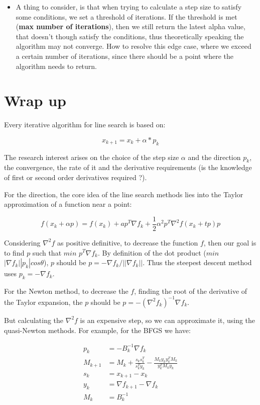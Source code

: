 \documentclass[a4paper,11pt]{article}
\numberwithin{equation}{section} %
\begin{document}
\begin{itemize}
    \item A thing to consider, is that when trying to calculate a step size to satisfy some conditions, we set a threshold of iterations. If the threshold is met (\textbf{max number of iterations}), then we still return the latest alpha value, that doesn't though satisfy the conditions, thus theoretically speaking the algorithm may not converge. How to resolve this edge case, where we exceed a certain number of iterations, since there should be a point where the algorithm needs to return.
    
\end{itemize} 


\section{Wrap up}

Every iterative algorithm for line search is based on:

\[x_{k+1} = x_k + \alpha*p_k\]

The research interest arises on the choice of the step size $\alpha$ and the direction $p_k$, the convergence, the rate of it and the derivative requirements (is the knowledge of first or second order derivatives required ?).

For the direction,  
the core idea of the line search methods lies into the Taylor approximation of a function near a point:

\[f(x_k + \alpha p) = f(x_k) + a p^T \nabla f_k + \frac{1}{2} \alpha^2 p^T \nabla^2 f(x_k + tp) p\]

Considering $\nabla^2 f$ as positive definitive, to decrease the function $f$, then our goal is to find $p$ such that
$min$ $p^T \nabla f_k$. By definition of the dot product ($min$ $|\nabla f_k| |p_k| cos \theta$), $p$ should be $p = - \nabla f_k / ||\nabla f_k||$. Thus the steepest descent method uses $p_k = - \nabla f_k$.

For the Newton method, to decrease the $f$, finding the root of the derivative of the Taylor expansion, the $p$ should be $p = - (\nabla^2 f_k) ^{-1} \nabla f_k$.

But calculating the $\nabla^2 f$ is an expensive step, so we can approximate it, using the quasi-Newton methods. For example, for the BFGS we have:

\begin{align}
    p_k &= -B_k^{-1} \nabla f_k \\
    M_{k+1} &= M_k + \frac{s_k s_k^T}{s_k^T y_k} - \frac{M_k y_k y_k^T M_k}{y_k^T M_k y_k} \\
    s_k &= x_{k+1} - x_k \\
    y_k &= \nabla f_{k+1} - \nabla f_k \\
    M_k &= B_k^{-1}
\end{align}
\end{document}
